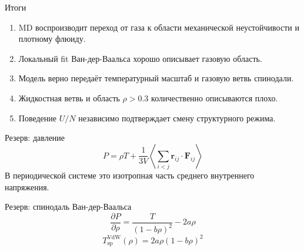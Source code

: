 \documentclass[aspectratio=169,11pt]{beamer}
\begin{document}
\begin{frame}{Итоги}
    \begin{enumerate}
        \item MD воспроизводит переход от газа к области механической неустойчивости и плотному флюиду.
        \item Локальный fit Ван-дер-Ваальса хорошо описывает газовую область.
        \item Модель верно передаёт температурный масштаб и газовую ветвь спинодали.
        \item Жидкостная ветвь и область $\rho>0.3$ количественно описываются плохо.
        \item Поведение $U/N$ независимо подтверждает смену структурного режима.
    \end{enumerate}
\end{frame}

\appendix

\begin{frame}{Резерв: давление}
    \[
    P=\rho T+\frac{1}{3V}\left\langle
        \sum_{i<j}\mathbf r_{ij}\cdot\mathbf F_{ij}
    \right\rangle
    \]
    В периодической системе это изотропная часть среднего внутреннего напряжения.
\end{frame}

\begin{frame}{Резерв: спинодаль Ван-дер-Ваальса}
    \[
    \frac{\partial P}{\partial\rho}=\frac{T}{(1-b\rho)^2}-2a\rho
    \]
    \[
    T_{\mathrm{sp}}^{\mathrm{VdW}}(\rho)=2a\rho(1-b\rho)^2
    \]
\end{frame}
\end{document}
